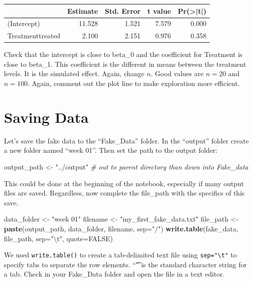 \documentclass[]{book}
\newenvironment{Shaded}{\begin{snugshade}}{\end{snugshade}}
\newcommand{\KeywordTok}[1]{\textcolor[rgb]{0.13,0.29,0.53}{\textbf{#1}}}
\newcommand{\DataTypeTok}[1]{\textcolor[rgb]{0.13,0.29,0.53}{#1}}
\newcommand{\CharTok}[1]{\textcolor[rgb]{0.31,0.60,0.02}{#1}}
\newcommand{\StringTok}[1]{\textcolor[rgb]{0.31,0.60,0.02}{#1}}
\newcommand{\CommentTok}[1]{\textcolor[rgb]{0.56,0.35,0.01}{\textit{#1}}}
\newcommand{\OtherTok}[1]{\textcolor[rgb]{0.56,0.35,0.01}{#1}}
\newcommand{\NormalTok}[1]{#1}
\theoremstyle{definition}
\theoremstyle{definition}
\theoremstyle{definition}
\theoremstyle{remark}
\begin{document}
\begin{tabular}{l|r|r|r|r}
\hline
  & Estimate & Std. Error & t value & Pr(>|t|)\\
\hline
(Intercept) & 11.528 & 1.521 & 7.579 & 0.000\\
\hline
Treatmenttreated & 2.100 & 2.151 & 0.976 & 0.358\\
\hline
\end{tabular}

Check that the intercept is close to beta\_0 and the coefficient for
Treatment is close to beta\_1. This coefficient is the different in
means between the treatment levels. It is the simulated effect. Again,
change \(n\). Good values are \(n=20\) and \(n=100\). Again, comment out
the plot line to make exploration more efficient.

\section{Saving Data}\label{saving-data}

Let's save the fake data to the ``Fake\_Data'' folder. In the ``output''
folder create a new folder named ``week 01''. Then set the path to the
output folder:

\begin{Shaded}
\begin{Highlighting}[]
\NormalTok{output_path <-}\StringTok{ "../output"} \CommentTok{# out to parent directory than down into Fake_data}
\end{Highlighting}
\end{Shaded}

This could be done at the beginning of the notebook, especially if many
output files are saved. Regardless, now complete the file\_path with the
specifics of this save.

\begin{Shaded}
\begin{Highlighting}[]
\NormalTok{data_folder <-}\StringTok{ "week 01"}
\NormalTok{filename <-}\StringTok{ "my_first_fake_data.txt"}
\NormalTok{file_path <-}\StringTok{ }\KeywordTok{paste}\NormalTok{(output_path, data_folder, filename, }\DataTypeTok{sep=}\StringTok{"/"}\NormalTok{)}
\KeywordTok{write.table}\NormalTok{(fake_data, file_path, }\DataTypeTok{sep=}\StringTok{"}\CharTok{\textbackslash{}t}\StringTok{"}\NormalTok{, }\DataTypeTok{quote=}\OtherTok{FALSE}\NormalTok{)}
\end{Highlighting}
\end{Shaded}

We used \texttt{write.table()} to create a tab-delimited text file using
\texttt{sep="\textbackslash{}t"} to specify tabs to separate the row
elements. ``\t'' is the standard character string for a tab. Check in
your Fake\_Data folder and open the file in a text editor.
\end{document}
